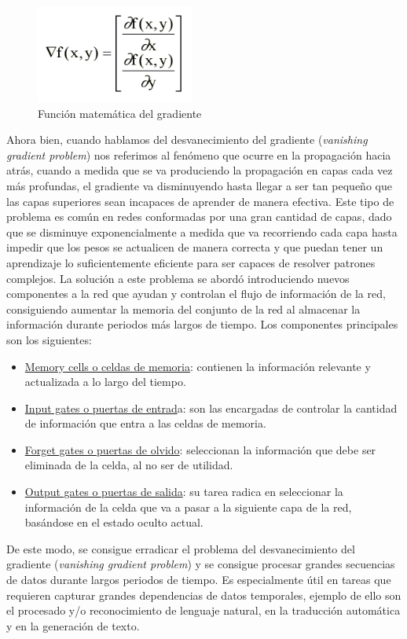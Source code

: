 \begin{figure}[h]
	\centering
	\includegraphics[width = 0.3 \textwidth]{Imagenes/Vectorial/gradiente.png}
	\caption{Función matemática del gradiente \citep{vectgrad}}
	\label{fig:gradiente}
\end{figure}

Ahora bien, cuando hablamos del desvanecimiento del gradiente (\textit{vanishing gradient problem}) nos referimos al fenómeno que ocurre en la propagación hacia atrás, cuando a medida que se va produciendo la propagación en capas cada vez más profundas, el gradiente va disminuyendo hasta llegar a ser tan pequeño que las capas superiores sean incapaces de aprender de manera efectiva. Este tipo de problema es común en redes conformadas por una gran cantidad de capas, dado que se disminuye exponencialmente a medida que va recorriendo cada capa hasta impedir que los pesos se actualicen de manera correcta y que puedan tener un aprendizaje lo suficientemente eficiente para ser capaces de resolver patrones complejos.
La solución a este problema se abordó introduciendo nuevos componentes a la red que ayudan y controlan el flujo de información de la red, consiguiendo aumentar la memoria del conjunto de la red al almacenar la información durante periodos más largos de tiempo. Los componentes principales son los siguientes:
\begin{itemize}
	\item \underline{Memory cells o celdas de memoria}: contienen la información relevante  y actualizada a lo largo del tiempo.
	\item \underline{Input gates o puertas de entrad}a: son las encargadas de controlar la cantidad de información que entra a las celdas de memoria.
	\item \underline{Forget gates o puertas de olvido}: seleccionan la información que debe ser eliminada de la celda, al no ser de utilidad.
	\item \underline{Output gates o puertas de salida}: su tarea radica en seleccionar la información de la celda que va a pasar a la siguiente capa de la red, basándose en el estado oculto actual.
\end{itemize}
 

De este modo, se consigue erradicar el problema del desvanecimiento del gradiente (\textit{vanishing gradient problem}) y se consigue procesar grandes secuencias de datos durante largos periodos de tiempo. Es especialmente útil en tareas que requieren capturar grandes dependencias de datos temporales, ejemplo de ello son el procesado y/o reconocimiento de lenguaje natural, en la traducción automática y en la generación de texto.\\

